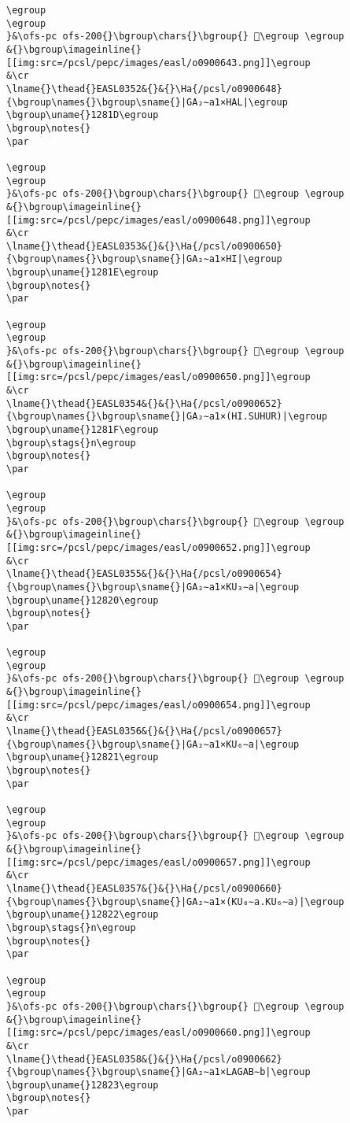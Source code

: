 \begin{verbatim}
\egroup
\egroup
}&\ofs-pc ofs-200{}\bgroup\chars{}\bgroup{} 󲳰\egroup \egroup
&{}\bgroup\imageinline{}[[img:src=/pcsl/pepc/images/easl/o0900643.png]]\egroup
&\cr
\lname{}\thead{}EASL0352&{}&{}\Ha{/pcsl/o0900648}{\bgroup\names{}\bgroup\sname{}|GA₂∼a1×HAL|\egroup
\bgroup\uname{}1281D\egroup
\bgroup\notes{}
\par 

\egroup
\egroup
}&\ofs-pc ofs-200{}\bgroup\chars{}\bgroup{} 𒠝\egroup \egroup
&{}\bgroup\imageinline{}[[img:src=/pcsl/pepc/images/easl/o0900648.png]]\egroup
&\cr
\lname{}\thead{}EASL0353&{}&{}\Ha{/pcsl/o0900650}{\bgroup\names{}\bgroup\sname{}|GA₂∼a1×HI|\egroup
\bgroup\uname{}1281E\egroup
\bgroup\notes{}
\par 

\egroup
\egroup
}&\ofs-pc ofs-200{}\bgroup\chars{}\bgroup{} 𒠞\egroup \egroup
&{}\bgroup\imageinline{}[[img:src=/pcsl/pepc/images/easl/o0900650.png]]\egroup
&\cr
\lname{}\thead{}EASL0354&{}&{}\Ha{/pcsl/o0900652}{\bgroup\names{}\bgroup\sname{}|GA₂∼a1×(HI.SUHUR)|\egroup
\bgroup\uname{}1281F\egroup
\bgroup\stags{}n\egroup
\bgroup\notes{}
\par 

\egroup
\egroup
}&\ofs-pc ofs-200{}\bgroup\chars{}\bgroup{} 𒠟\egroup \egroup
&{}\bgroup\imageinline{}[[img:src=/pcsl/pepc/images/easl/o0900652.png]]\egroup
&\cr
\lname{}\thead{}EASL0355&{}&{}\Ha{/pcsl/o0900654}{\bgroup\names{}\bgroup\sname{}|GA₂∼a1×KU₃∼a|\egroup
\bgroup\uname{}12820\egroup
\bgroup\notes{}
\par 

\egroup
\egroup
}&\ofs-pc ofs-200{}\bgroup\chars{}\bgroup{} 𒠠\egroup \egroup
&{}\bgroup\imageinline{}[[img:src=/pcsl/pepc/images/easl/o0900654.png]]\egroup
&\cr
\lname{}\thead{}EASL0356&{}&{}\Ha{/pcsl/o0900657}{\bgroup\names{}\bgroup\sname{}|GA₂∼a1×KU₆∼a|\egroup
\bgroup\uname{}12821\egroup
\bgroup\notes{}
\par 

\egroup
\egroup
}&\ofs-pc ofs-200{}\bgroup\chars{}\bgroup{} 𒠡\egroup \egroup
&{}\bgroup\imageinline{}[[img:src=/pcsl/pepc/images/easl/o0900657.png]]\egroup
&\cr
\lname{}\thead{}EASL0357&{}&{}\Ha{/pcsl/o0900660}{\bgroup\names{}\bgroup\sname{}|GA₂∼a1×(KU₆∼a.KU₆∼a)|\egroup
\bgroup\uname{}12822\egroup
\bgroup\stags{}n\egroup
\bgroup\notes{}
\par 

\egroup
\egroup
}&\ofs-pc ofs-200{}\bgroup\chars{}\bgroup{} 𒠢\egroup \egroup
&{}\bgroup\imageinline{}[[img:src=/pcsl/pepc/images/easl/o0900660.png]]\egroup
&\cr
\lname{}\thead{}EASL0358&{}&{}\Ha{/pcsl/o0900662}{\bgroup\names{}\bgroup\sname{}|GA₂∼a1×LAGAB∼b|\egroup
\bgroup\uname{}12823\egroup
\bgroup\notes{}
\par 


\end{verbatim}
